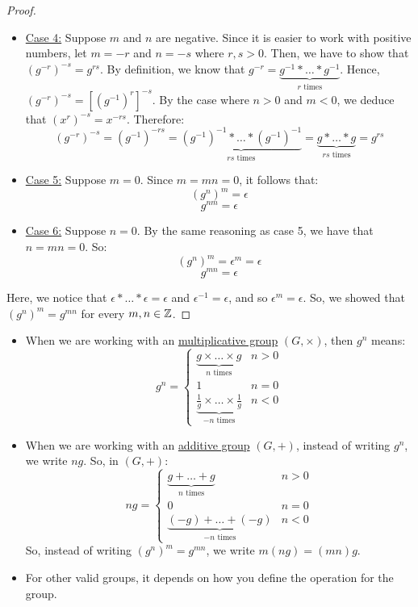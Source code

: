 \documentclass[letterpaper]{article}
\begin{document}
\begin{mdframed}
\begin{proof}
\begin{itemize}
            \item \underline{Case 4:} Suppose $m$ and $n$ are negative. Since it is easier to work with positive numbers, let $m = -r$ and $n = -s$ where $r, s > 0$. Then, we have to show that $(g^{-r})^{-s} = g^{rs}$. By definition, we know that $g^{-r} = \underbrace{g^{-1} * \dots * g^{-1}}_{r \text{ times}}$. Hence, $(g^{-r})^{-s} = [(g^{-1})^r]^{-s}$. By the case where $n > 0$ and $m < 0$, we deduce that $(x^r)^{-s} = x^{-rs}$. Therefore: 
            \[(g^{-r})^{-s} = (g^{-1})^{-rs} = \underbrace{(g^{-1})^{-1} * \dots * (g^{-1})^{-1}}_{rs \text{ times}} = \underbrace{g * \dots * g}_{rs \text{ times}} = g^{rs}\]

            \item \underline{Case 5:} Suppose $m = 0$. Since $m = mn = 0$, it follows that: 
            \[(g^n)^m = \epsilon\]
            \[g^{nm} = \epsilon\]

            \item \underline{Case 6:} Suppose $n = 0$. By the same reasoning as case 5, we have that $n = mn = 0$. So: 
            \[(g^n)^m = \epsilon^m = \epsilon\]
            \[g^{mn} = \epsilon\]
        \end{itemize}

        Here, we notice that $\epsilon * \dots * \epsilon = \epsilon$ and $\epsilon^{-1} = \epsilon$, and so $\epsilon^m = \epsilon$. So, we showed that $(g^n)^m = g^{mn}$ for every $m, n \in \mathbb{Z}$. 
    \end{proof}
\end{mdframed}

\begin{note*}{}{}
    \begin{itemize}
        \item When we are working with an \underline{multiplicative group} $(G, \times)$, then $g^n$ means:
        \[g^n = \begin{cases}
            \underbrace{g \times \dots \times g}_{n \text{ times}} & n > 0 \\ 
            1 & n = 0 \\ 
            \underbrace{\frac{1}{g} \times \dots \times \frac{1}{g}}_{-n \text{ times}} & n < 0
        \end{cases}\]

        \item When we are working with an \underline{additive group} $(G, +)$, instead of writing $g^n$, we write $ng$. So, in $(G, +)$: 
        \[ng = \begin{cases}
            \underbrace{g + \dots + g}_{n \text{ times}} & n > 0 \\ 
            0 & n = 0 \\ 
            \underbrace{(-g) + \dots + (-g)}_{-n \text{ times}} & n < 0
        \end{cases}\]
        So, instead of writing $(g^{n})^m = g^{mn}$, we write $m(ng) = (mn)g$.

        \item For other valid groups, it depends on how you define the operation for the group. 
    \end{itemize}
\end{note*}
\end{document}
